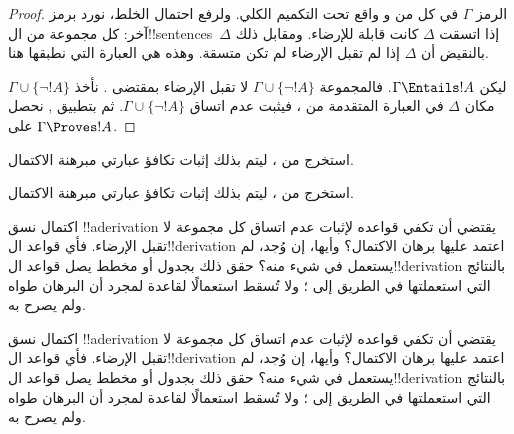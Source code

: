 \documentclass[../../../include/open-logic-section]{subfiles}
\begin{document}
\begin{proof}
الرمز $\Gamma$ في كل من  و
 واقع تحت التكميم الكلي. ولرفع احتمال الخلط،
نورد  برمز آخر: كل مجموعة من
ال!!{sentence}s~$\Delta$ إذا اتسقت $\Delta$ كانت قابلة للإرضاء.
ومقابل ذلك بالنقيض أن $\Delta$ إذا لم تقبل الإرضاء لم تكن متسقة.
وهذه هي العبارة التي نطبقها هنا.

ليكن $\Gamma \Entails !A$. فالمجموعة $\Gamma \cup \{\lnot !A\}$
لا تقبل الإرضاء بمقتضى . نأخذ
$\Gamma \cup \{\lnot !A\}$ مكان $\Delta$ في العبارة المتقدمة من
، فيثبت عدم اتساق $\Gamma \cup \{\lnot !A\}$.
ثم بتطبيق
,
نحصل على $\Gamma \Proves !A$.
\end{proof}

\begin{prob}
استخرج من 
، ليتم بذلك إثبات تكافؤ
عبارتي مبرهنة الاكتمال.
\end{prob}
\tagendprob

\begin{prob}
استخرج من 
، ليتم بذلك إثبات تكافؤ
عبارتي مبرهنة الاكتمال.
\end{prob}
\tagendprob

\begin{prob}
اكتمال نسق !!a{derivation} يقتضي أن تكفي قواعده لإثبات عدم اتساق
كل مجموعة لا تقبل الإرضاء. فأي قواعد ال!!{derivation} اعتمد عليها
برهان الاكتمال؟ وأيها، إن وُجد، لم يستعمل في شيء منه؟ حقق ذلك بجدول
أو مخطط يصل قواعد ال!!{derivation} بالنتائج التي استعملتها في الطريق
إلى ؛ ولا تُسقط استعمالًا
لقاعدة لمجرد أن البرهان طواه ولم يصرح به.
\end{prob}
\tagendprob

\begin{prob}
اكتمال نسق !!a{derivation} يقتضي أن تكفي قواعده لإثبات عدم اتساق
كل مجموعة لا تقبل الإرضاء. فأي قواعد ال!!{derivation} اعتمد عليها
برهان الاكتمال؟ وأيها، إن وُجد، لم يستعمل في شيء منه؟ حقق ذلك بجدول
أو مخطط يصل قواعد ال!!{derivation} بالنتائج التي استعملتها في الطريق
إلى ؛ ولا تُسقط استعمالًا
لقاعدة لمجرد أن البرهان طواه ولم يصرح به.
\end{prob}
\tagendprob
\end{document}
